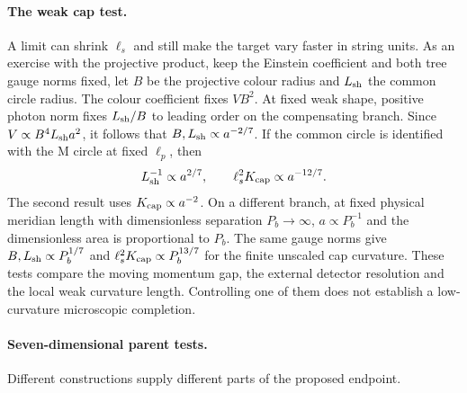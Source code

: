 \documentclass[10pt]{article}
\theoremstyle{definition}
\begin{document}
\paragraph{The weak cap test.}
A limit can shrink \(\ell_s\) and still make the target vary faster in string units. As an exercise with the projective product, keep the Einstein coefficient and both tree gauge norms fixed, let \(B\) be the projective colour radius and \(L_{\rm sh}\) the common circle radius. The colour coefficient fixes \(VB^2\). At fixed weak shape, positive photon norm fixes \(L_{\rm sh}/B\) to leading order on the compensating branch. Since \(V\propto B^4L_{\rm sh}a^2\), it follows that \(B,L_{\rm sh}\propto a^{-2/7}\). If the common circle is identified with the M circle at fixed \(\ell_p\), then
\begin{equation}
  L_{\rm sh}^{-1}\propto a^{2/7},\qquad
  \ell_s^2 K_{\rm cap}\propto a^{-12/7}.
\end{equation}
The second result uses \(K_{\rm cap}\propto a^{-2}\). On a different branch, at fixed physical meridian length with dimensionless separation \(P_b\to\infty\), \(a\propto P_b^{-1}\) and the dimensionless area is proportional to \(P_b\). The same gauge norms give \(B,L_{\rm sh}\propto P_b^{1/7}\) and \(\ell_s^2K_{\rm cap}\propto P_b^{13/7}\) for the finite unscaled cap curvature. These tests compare the moving momentum gap, the external detector resolution and the local weak curvature length. Controlling one of them does not establish a low-curvature microscopic completion.

\paragraph{Seven-dimensional parent tests.}
Different constructions supply different parts of the proposed endpoint.
\end{document}
